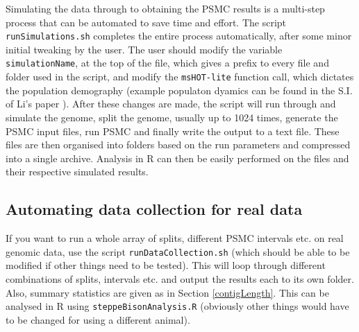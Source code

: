 \documentclass[11pt,a4paper]{article}
\begin{document}
Simulating the data through to obtaining the PSMC results is a multi-step process that can be automated to save time and effort. The script \verb|runSimulations.sh| completes the entire process automatically, after some minor initial tweaking by the user. The user should modify the variable \verb|simulationName|, at the top of the file, which gives a prefix to every file and folder used in the script, and modify the \verb|msHOT-lite| function call, which dictates the population demography (example populaton dyamics can be found in the S.I. of Li's paper \cite{li2011inference}). After these changes are made, the script will run through and simulate the genome, split the genome, usually up to 1024 times, generate the PSMC input files, run PSMC and finally write the output to a text file. These files are then organised into folders based on the run parameters and compressed into a single archive. Analysis in R can then be easily performed on the files and their respective simulated results.

\subsection{Automating data collection for real data}
If you want to run a whole array of splits, different PSMC intervals etc. on real genomic data, use the script \verb|runDataCollection.sh| (which should be able to be modified if other things need to be tested). This will loop through different combinations of splits, intervals etc. and output the results each to its own folder. Also, summary statistics are given as in Section \ref{contigLength}. This can be analysed in R using \verb|steppeBisonAnalysis.R| (obviously other things would have to be changed for using a different animal).
\end{document}
